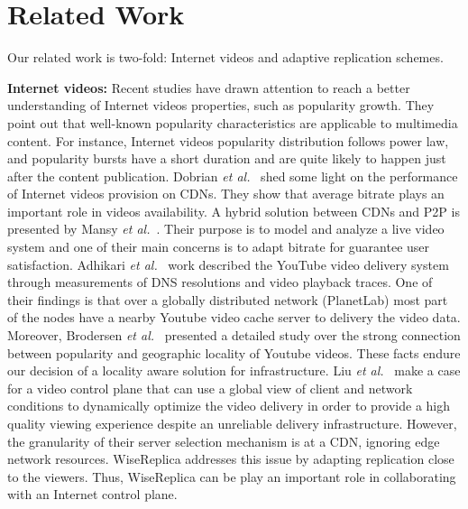 \section{Related Work}
\label{sec:related_work}

Our related work is two-fold: Internet videos and adaptive replication schemes.

\noindent \textbf{Internet videos:} Recent studies
\cite{youtube_wsdm_2011,popularity_prediction_2010} have drawn
attention to reach a better understanding of Internet videos
properties, such as popularity growth. They point out that well-known
popularity characteristics are applicable to multimedia content. For
instance, Internet videos popularity distribution follows power law,
and popularity bursts have a short duration and are quite likely to
happen just after the content publication. Dobrian \emph{et
al.}~\cite{Dobrian_sigcomm_2011} shed some light on the performance of
Internet videos provision on CDNs. They show that average bitrate plays
an important role in videos availability. A hybrid solution between
CDNs and P2P is presented by Mansy \emph{et
al.}~\cite{Mansy_icnp_2011}. Their purpose is to model and analyze a
live video system and one of their main concerns is to adapt bitrate
for guarantee user satisfaction. Adhikari \emph{et
al.}~\cite{Adhikari_infocom_2012} work described the YouTube video
delivery system through measurements of DNS resolutions and video
playback traces. One of their findings is that over a globally
distributed network (PlanetLab) most part of the nodes have a nearby
Youtube video cache server to delivery the video data.  Moreover,
Brodersen \emph{et al.}~\cite{Brodersen_www_2012} presented a detailed
study over the strong connection between popularity and geographic
locality of Youtube videos. These facts endure our decision of a
locality aware solution for infrastructure. Liu \emph{et
al.}~\cite{Liu_sigcomm_2012} make a case for a video control plane
that can use a global view of client and network conditions to
dynamically optimize the video delivery in order to provide a high
quality viewing experience despite an unreliable delivery
infrastructure. However, the granularity of their server selection
mechanism is at a CDN, ignoring edge network resources. WiseReplica
addresses this issue by adapting replication close to the viewers.
Thus, WiseReplica can be play an important role in collaborating with an
Internet control plane.


